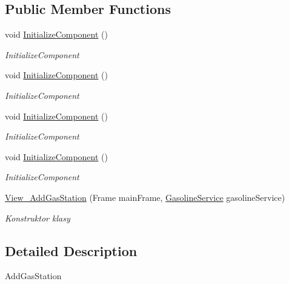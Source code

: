 \subsection*{Public Member Functions}
\begin{DoxyCompactItemize}
\item 
void \mbox{\hyperlink{class_gasoline_desktop_1_1_view___add_gas_station_ac4b16228281e3a2095d38884963fd93f}{Initialize\+Component}} ()
\begin{DoxyCompactList}\small\item\em Initialize\+Component \end{DoxyCompactList}\item 
void \mbox{\hyperlink{class_gasoline_desktop_1_1_view___add_gas_station_ac4b16228281e3a2095d38884963fd93f}{Initialize\+Component}} ()
\begin{DoxyCompactList}\small\item\em Initialize\+Component \end{DoxyCompactList}\item 
void \mbox{\hyperlink{class_gasoline_desktop_1_1_view___add_gas_station_ac4b16228281e3a2095d38884963fd93f}{Initialize\+Component}} ()
\begin{DoxyCompactList}\small\item\em Initialize\+Component \end{DoxyCompactList}\item 
void \mbox{\hyperlink{class_gasoline_desktop_1_1_view___add_gas_station_ac4b16228281e3a2095d38884963fd93f}{Initialize\+Component}} ()
\begin{DoxyCompactList}\small\item\em Initialize\+Component \end{DoxyCompactList}\item 
\mbox{\hyperlink{class_gasoline_desktop_1_1_view___add_gas_station_af8c05d6d1707bb2671c8a33bac064a1e}{View\+\_\+\+Add\+Gas\+Station}} (Frame main\+Frame, \mbox{\hyperlink{class_gasoline_desktop_1_1_gasoline_service}{Gasoline\+Service}} gasoline\+Service)
\begin{DoxyCompactList}\small\item\em Konstruktor klasy \end{DoxyCompactList}\end{DoxyCompactItemize}


\subsection{Detailed Description}
Add\+Gas\+Station 

